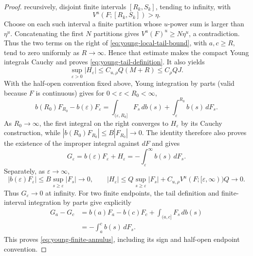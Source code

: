 \documentclass[11pt]{article}
\numberwithin{equation}{section}
\theoremstyle{remark}
\theoremstyle{definition}
\begin{document}
\begin{proof}
recursively, disjoint finite intervals $[R_k,S_k]$, tending to infinity,
with
\[
 V^u(F;[R_k,S_k])>\eta.
\]
Choose on each such interval a finite partition whose $u$-power sum is
larger than $\eta^u$.  Concatenating the first $N$ partitions gives
$V^u(F)^u\ge N\eta^u$, a contradiction.  Thus the two terms on the
right of \eqref{eq:young-local-tail-bound}, with $a,c\ge R$, tend to zero
uniformly as $R\to\infty$.  Hence that estimate makes the compact
Young integrals Cauchy and proves \eqref{eq:young-tail-definition}.  It also
yields
\begin{equation}\label{eq:young-tail-supremum}
 \sup_{\varepsilon>0}|H_\varepsilon|
 \le C_{u,\rho}Q(M+R)\le C_\rho QJ.
\end{equation}
With the half-open convention fixed above, Young integration by parts
(valid because $F$ is continuous) gives for
$0<\varepsilon<R_0<\infty$,
\[
 b(R_0)F_{R_0}-b(\varepsilon)F_\varepsilon
 =\int_{(\varepsilon,R_0]}F_s\,db(s)
  +\int_\varepsilon^{R_0}b(s)\,dF_s.
\]
As $R_0\to\infty$, the first integral on the right converges to
$H_\varepsilon$ by its Cauchy construction, while
$|b(R_0)F_{R_0}|\le B|F_{R_0}|\to0$.  The identity therefore also proves
the existence of the improper integral against $dF$ and gives
\begin{equation}\label{eq:young-tail-integration-by-parts}
 G_\varepsilon
 =b(\varepsilon)F_\varepsilon+H_\varepsilon
 =-\int_\varepsilon^\infty b(s)\,dF_s.
\end{equation}
Separately, as $\varepsilon\to\infty$,
\[
 |b(\varepsilon)F_\varepsilon|
 \le B\sup_{s\ge\varepsilon}|F_s|\longrightarrow0,
 \qquad
 |H_\varepsilon|
 \le Q\sup_{s\ge\varepsilon}|F_s|
   +C_{u,\rho}V^u(F;[\varepsilon,\infty))Q\longrightarrow0.
\]
Thus $G_\varepsilon\to0$ at infinity.  For two finite endpoints, the
tail definition and finite-interval integration by parts give explicitly
\begin{align*}
 G_a-G_c
 &=b(a)F_a-b(c)F_c+\int_{(a,c]}F_s\,db(s)\\
 &=-\int_a^c b(s)\,dF_s.
\end{align*}
This proves \eqref{eq:young-finite-annulus}, including its sign and
half-open endpoint convention.


\end{proof}
\end{document}
